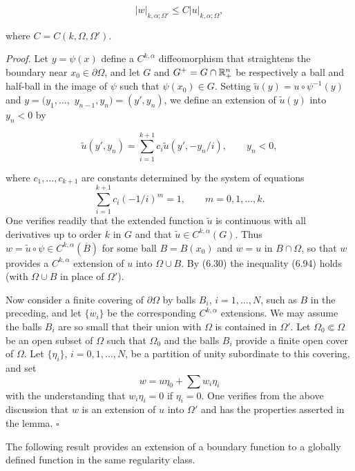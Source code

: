 \[
\tag{6.94}
\lvert w \rvert_{k,\alpha;\Omega'} \le C \lvert u \rvert_{k,\alpha;\Omega},
\]

\begin{flushleft}
where $C = C(k,\Omega,\Omega')$.
\end{flushleft}

\begin{flushleft}
\emph{Proof.} Let $y=\psi(x)$ define a $C^{k,\alpha}$ diffeomorphism that straightens the boundary
near $x_0 \in \partial \Omega$, and let $G$ and $G^+ = G \cap \mathbb{R}^n_+$ be respectively a ball and half-ball in
the image of $\psi$ such that $\psi(x_0) \in G$. Setting $\tilde u(y)=u \circ \psi^{-1}(y)$ and $y=(y_1,\ldots,$
$y_{n-1},y_n)=(y',y_n)$, we define an extension of $\tilde u(y)$ into $y_n<0$ by
\end{flushleft}

\[
\tilde u(y',y_n)=\sum_{i=1}^{k+1} c_i \tilde u(y',-y_n/i), \qquad y_n<0,
\]


where $c_1,\dots,c_{k+1}$ are constants determined by the system of equations
\[
  \sum_{i=1}^{k+1} c_i (-1/i)^m = 1, \qquad m=0,1,\dots,k.
\]
One verifies readily that the extended function $\tilde u$ is continuous with all derivatives
up to order $k$ in $G$ and that $\tilde u \in C^{k,\alpha}(G)$. Thus $w=\tilde u \circ \psi \in C^{k,\alpha}(\overline{B})$ for some ball
$B=B(x_0)$ and $w=u$ in $B\cap\Omega$, so that $w$ provides a $C^{k,\alpha}$ extension of $u$ into $\Omega\cup B$.
By (6.30) the inequality (6.94) holds (with $\Omega\cup B$ in place of $\Omega'$).

Now consider a finite covering of $\partial\Omega$ by balls $B_i$, $i=1,\dots,N$, such as $B$ in the
preceding, and let $\{w_i\}$ be the corresponding $C^{k,\alpha}$ extensions. We may assume the
balls $B_i$ are so small that their union with $\Omega$ is contained in $\Omega'$. Let $\Omega_0\Subset\Omega$
be an open subset of $\Omega$ such that $\Omega_0$ and the balls $B_i$ provide a finite open cover
of $\Omega$. Let $\{\eta_i\}$, $i=0,1,\dots,N$, be a partition of unity subordinate to this covering,
and set
\[
  w=u\eta_0+\sum w_i\eta_i
\]
with the understanding that $w_i\eta_i=0$ if $\eta_i=0$. One verifies from the above discussion
that $w$ is an extension of $u$ into $\Omega'$ and has the properties asserted in the lemma. $\square$

The following result provides an extension of a boundary function to a globally
defined function in the same regularity class.

